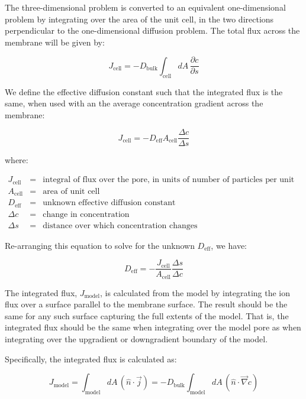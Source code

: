 \documentclass{article}
\begin{document}
The three-dimensional problem is converted to an equivalent one-dimensional problem
by integrating over the area of the unit cell, in the two directions perpendicular to
the one-dimensional diffusion problem.
The total flux across the membrane will be given by:

\begin{equation}
J_{\mathrm{cell}} = - D_{\mathrm{bulk}}\int_{\mathrm{cell}} dA\, \frac{\partial c}{\partial s}
\end{equation}

We define the effective diffusion constant such that the integrated flux is the same,
when used with an the average concentration gradient across the membrane:

\begin{equation}
J_{\mathrm{cell}} = - D_{\mathrm{eff}} A_{\mathrm{cell}} \frac{\Delta c}{\Delta s}
\end{equation}

where:

$\begin{array}{rcl}
J_{\text{cell}} & = & \text{integral of flux over the pore, in units of number of particles per unit time} \\
A_{\text{cell}} & = & \text{area of unit cell} \\
D_{\text{eff}} & = & \text{unknown effective diffusion constant} \\
\Delta c & = & \text{change in concentration} \\
\Delta s & = & \text{distance over which concentration changes}
\end{array}$

Re-arranging this equation to solve for the unknown $D_{\mathrm{eff}}$, we have:

\begin{equation}
D_{\mathrm{eff}} = - \frac{J_{\mathrm{cell}}}{A_{\mathrm{cell}}} \frac{\Delta s}{\Delta c}
\end{equation}

The integrated flux, $J_{\mathrm{model}}$, is calculated from the model by integrating
the ion flux over a surface parallel to the membrane surface.
The result should be the same for any such surface capturing the full extents of the model.
That is, the integrated flux should be the same when integrating over the model pore as
when integrating over the upgradient or downgradient boundary of the model.

Specifically, the integrated flux is calculated as:

\begin{equation}
J_{\mathrm{model}} = \int_{\mathrm{model}} dA\, \left(\hat{n} \cdot \vec{j} \right)
 = - D_{\mathrm{bulk}} \int_{\mathrm{model}} dA\, \left(\hat{n} \cdot \vec{\nabla} c \right)
\end{equation}
\end{document}
